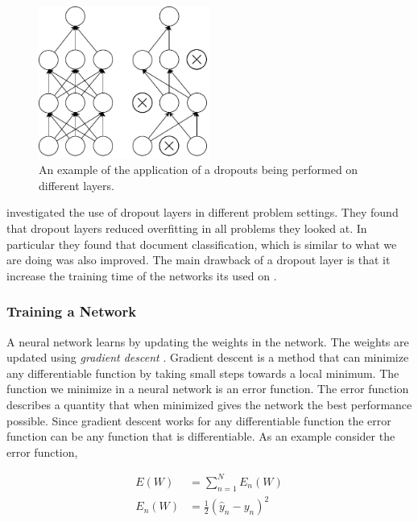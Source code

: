 \begin{description}
        \begin{figure}
            \centering
            \includegraphics[width=0.5\textwidth]{./pictures/method/dropout}
            \caption{An example of the application of a dropouts being performed
                on different layers.}
            \label{fig:dropout}
        \end{figure}

        \citet{JMLR:v15:srivastava14a} investigated the use of dropout
        layers in different problem settings. They found that dropout layers
        reduced overfitting in all problems they looked at. In particular
        they found that document classification, which is similar to what we
        are doing was also improved. The main drawback of a dropout layer
        is that it increase the training time of the networks its used on
        \citep{JMLR:v15:srivastava14a}.

\end{description}


\subsubsection{Training a Network} \label{subsubsec:training_a_network}

A neural network learns by updating the weights in the network. The weights are
updated using \textit{gradient descent} \citep{Bishop}. Gradient descent is
a method that can minimize any differentiable function by taking small steps
towards a local minimum. The function we minimize in a neural network is an
error function. The error function describes a quantity that when minimized
gives the network the best performance possible. Since gradient descent works
for any differentiable function the error function can be any function that is
differentiable. As an example consider the error function,

\begin{align}
    E(W)   &= \sum_{n=1}^{N} E_n(W) \\
    E_n(W) &= \frac{1}{2} \left( \hat{y}_n - y_n \right)^2
\end{align}

